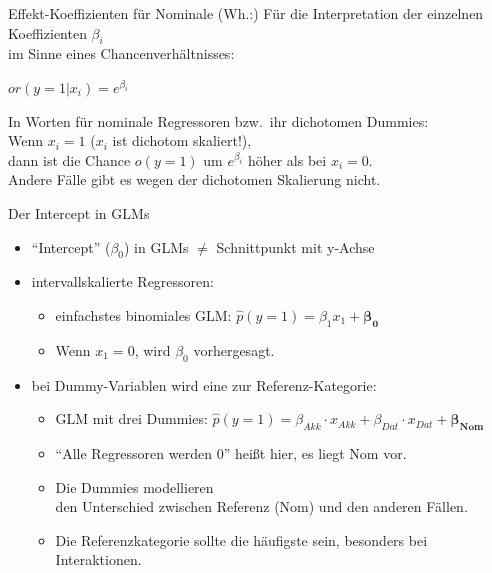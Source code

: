\begin{frame}
  {Effekt-Koeffizienten für Nominale}
  (Wh.:) Für die Interpretation der einzelnen Koeffizienten $\beta_i$\\
  im Sinne eines Chancenverhältnisses:
  \begin{center}
    \alert{$or(y=1|x_i)=e^{\beta_i}$}
  \end{center}
  \pause
  In Worten \alert{für nominale Regressoren} bzw.\ ihr \alert{dichotomen Dummies}:\\
  \vspace{0.5cm}
  \pause
  Wenn $x_i=1$ ($x_i$ ist dichotom skaliert!),\\
  dann ist die Chance $o(y=1)$ um $e^{\beta_i}$ höher als bei $x_i=0$.\\
  \pause
  Andere Fälle gibt es wegen der dichotomen Skalierung nicht.
\end{frame}

\begin{frame}
  {Der Intercept in GLMs}
  \begin{itemize}[<+->]
    \item "`Intercept"' ($\beta_0$) in GLMs $\neq$ Schnittpunkt mit y-Achse
      \vspace{0.5cm}
    \item \alert{intervallskalierte Regressoren}:
      \begin{itemize}
	\item einfachstes binomiales GLM: \alert{$\hat{p}(y=1)=\beta_1x_1+\mathbf{\beta_0}$}
	\item Wenn $x_1=0$, wird $\beta_0$ vorhergesagt.
      \end{itemize}
      \vspace{0.5cm}
    \item bei \alert{Dummy-Variablen} wird eine zur Referenz-Kategorie:
      \begin{itemize}
	\item GLM mit drei Dummies: \alert{$\hat{p}(y=1)=\beta_{Akk}\cdot x_{Akk}+\beta_{Dat}\cdot x_{Dat}+\mathbf{\beta_{Nom}}$}
	\item "`Alle Regressoren werden 0"' heißt hier, es liegt Nom vor.
	\item Die Dummies modellieren\\
	  den \alert{Unterschied zwischen Referenz (Nom) und den anderen Fällen}.
	\item Die Referenzkategorie sollte die häufigste sein, besonders bei Interaktionen.
      \end{itemize}
  \end{itemize}
\end{frame}

